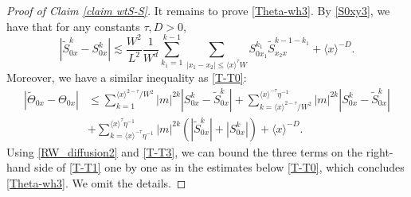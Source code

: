 \documentclass{article}
\newcommand{\1}{\mathds{1}}
\numberwithin{equation}{section}
\newcommand{\be}{\begin{equation}}
\newcommand{\ee}{\end{equation}}
\newcommand{\wh}{\widehat}
\newcommand{\wt}{\widetilde}
\renewcommand{\leq}{\leqslant}
\renewcommand{\le}{\leq}
\theoremstyle{plain} %
\theoremstyle{remark}
\begin{document}
\begin{proof}[Proof of Claim \ref{claim wtS-S}]
It remains to prove \eqref{Theta-wh3}. By \eqref{S0xy3}, we have that for any constants $ \tau,D>0$,
\be\label{T-T3}\left| \wt S^k_{0x} - S^k _{0x}\right| \lesssim \frac{W^{2}}{L^2} \frac{1}{W^d} \sum_{k_1=1}^{k-1} \sum_{|x_1-x_2|\le \langle x\rangle^\tau W }S^{k_1}_{0x_1} \wt S^{k-1-k_1}_{x_2 x} + \langle x\rangle^{-D}.\ee
Moreover, we have a similar inequality as \eqref{T-T0}:
\begin{align}
	|\wt\Theta_{0x}  - \Theta_{0x}| &\le \sum_{k=1}^{ \langle x\rangle^{2-\tau}/W^2} |m|^{2k}\left|S^k_{0x} - \wt S^k _{0x}\right| + \sum_{k= \langle x\rangle^{2-\tau}/W^2}^{\langle x\rangle^{-\tau}\eta^{-1}} |m|^{2k}\left|S^k_{0x} - \wt S^k _{0x}\right|   \nonumber\\
	&+ \sum_{k=\langle x\rangle^{-\tau}\eta^{-1}}^{\langle x\rangle^\tau\eta^{-1}} |m|^{2k} \left(\left|\wt S^k_{0x}\right|+\left|S^k_{0x}\right|\right) + \langle x\rangle^{-D} .\label{T-T1}
\end{align}
Using \eqref{RW_diffusion2} and \eqref{T-T3}, we can bound the three terms on the right-hand side of \eqref{T-T1} one by one as in the estimates below \eqref{T-T0}, which concludes \eqref{Theta-wh3}. We omit the details. 
\end{proof}
\end{document}
